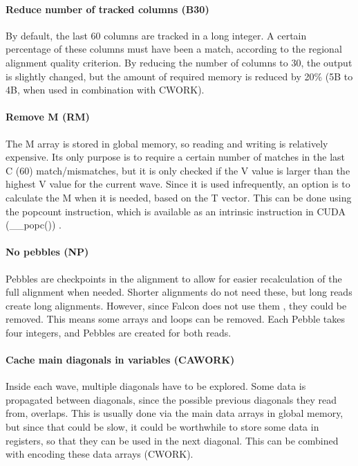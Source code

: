 \documentclass[../main/thesis.tex]{subfiles}
\begin{document}

\paragraph{Reduce number of tracked columns (B30)}
By default, the last 60 columns are tracked in a long integer.
A certain percentage of these columns must have been a match, according to the regional alignment quality criterion.
By reducing the number of columns to 30, the output is slightly changed, but the amount of required memory is reduced by 20\% (5B to 4B, when used in combination with CWORK).

\paragraph{Remove M (RM)}
The M array is stored in global memory, so reading and writing is relatively expensive.
Its only purpose is to require a certain number of matches in the last C (60) match/mismatches, but it is only checked if the V value is larger than the highest V value for the current wave.
Since it is used infrequently, an option is to calculate the M when it is needed, based on the T vector.
This can be done using the popcount instruction, which is available as an intrinsic instruction in CUDA (\_\_popc()) \cite{CUDA_math}. 

\paragraph{No pebbles (NP)}
Pebbles are checkpoints in the alignment to allow for easier recalculation of the full alignment when needed.
Shorter alignments do not need these, but long reads create long alignments.
However, since Falcon does not use them \cite{Falcon}, they could be removed.
This means some arrays and loops can be removed.
Each Pebble takes four integers, and Pebbles are created for both reads.

\paragraph{Cache main diagonals in variables (CAWORK)}
Inside each wave, multiple diagonals have to be explored.
Some data is propagated between diagonals, since the possible previous diagonals they read from, overlaps.
This is usually done via the main data arrays in global memory, but since that could be slow, it could be worthwhile to store some data in registers, so that they can be used in the next diagonal.
This can be combined with encoding these data arrays (CWORK).
\end{document}
